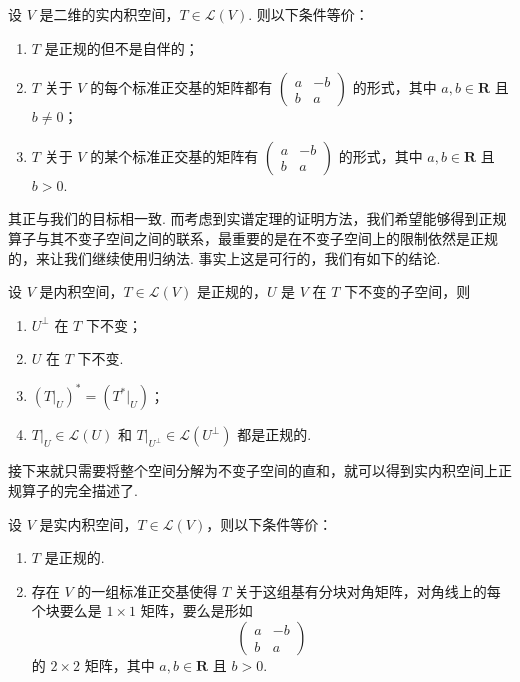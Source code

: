 \begin{theorem}
    设 $ V $ 是二维的实内积空间，$ T \in \mathcal{L}(V) $. 则以下条件等价：
    \begin{enumerate}
        \item $ T $ 是正规的但不是自伴的；

        \item $ T $ 关于 $ V $ 的每个标准正交基的矩阵都有 $ \begin{pmatrix} a & -b \\ b & a \end{pmatrix} $ 的形式，其中 $ a, b \in \mathbf{R} $ 且 $ b \neq 0 $；

        \item $ T $ 关于 $ V $ 的某个标准正交基的矩阵有 $ \begin{pmatrix} a & -b \\ b & a \end{pmatrix} $ 的形式，其中 $ a, b \in \mathbf{R} $ 且 $ b > 0 $.
    \end{enumerate}
\end{theorem}

其正与我们的目标相一致. 而考虑到实谱定理的证明方法，我们希望能够得到正规算子与其不变子空间之间的联系，最重要的是在不变子空间上的限制依然是正规的，来让我们继续使用归纳法. 事实上这是可行的，我们有如下的结论.

\begin{theorem}
    设 $ V $ 是内积空间，$ T \in \mathcal{L}(V) $ 是正规的，$ U $ 是 $ V $ 在 $ T $ 下不变的子空间，则
    \begin{enumerate}
        \item $ U^{\perp} $ 在 $ T $ 下不变；

        \item $ U $ 在 $ T $ 下不变.

        \item $ (T|_U)^* = (T^*|_U) $；

        \item $ T|_U \in \mathcal{L}(U) $ 和 $ T|_{U^{\perp }} \in \mathcal{L}(U^{\perp }) $ 都是正规的.
    \end{enumerate}
\end{theorem}

接下来就只需要将整个空间分解为不变子空间的直和，就可以得到实内积空间上正规算子的完全描述了.

\begin{theorem}
    设 $ V $ 是实内积空间，$ T \in \mathcal{L}(V) $，则以下条件等价：
    \begin{enumerate}
        \item $ T $ 是正规的.

        \item 存在 $ V $ 的一组标准正交基使得 $ T $ 关于这组基有分块对角矩阵，对角线上的每个块要么是 $ 1 \times 1 $ 矩阵，要么是形如
        \[
            \begin{pmatrix}
                a & -b \\
                b & a
            \end{pmatrix}
        \]
        的 $ 2 \times 2 $ 矩阵，其中 $ a, b \in \mathbf{R} $ 且 $ b > 0 $.
    \end{enumerate}
\end{theorem}

